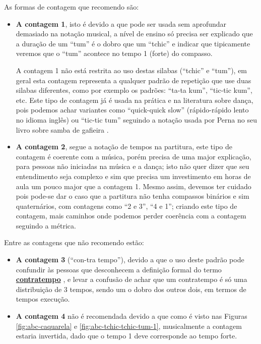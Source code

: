 As formas de contagem que recomendo são:
\begin{itemize}
\item \textbf{A contagem 1}, 
isto é devido a que pode ser usada sem aprofundar demasiado 
na notação musical, a nível de ensino só precisa ser explicado que a duração de um 
``tum'' é o dobro que um ``tchic'' e indicar que tipicamente veremos que o ``tum''
acontece no tempo 1 (forte) do compasso.

A contagem 1 não está restrita ao uso destas silabas (``tchic'' e ``tum''), 
em geral esta contagem representa a qualquer padrão de repetição
que use duas silabas diferentes, como por exemplo os padrões: ``ta-ta kum'', ``tic-tic kum'', etc. 
Este tipo de contagem já é usada na prática e na literatura sobre dança, pois 
podemos achar variantes como ``quick-quick slow'' (rápido-rápido lento no idioma inglês)
ou ``tic-tic tum'' seguindo a notação usada por Perna no seu livro sobre samba de gafieira \cite[pp. 146]{perna2002samba}.
\item \textbf{A contagem 2}, segue a notação de tempos na partitura, este tipo de
contagem é coerente com a música, porém precisa de uma major explicação, 
para pessoas não iniciadas na música e a dança; isto não quer dizer que seu
entendimento seja complexo e sim que precisa um investimento em horas de aula
um pouco major que a contagem 1.
Mesmo assim, devemos ter cuidado pois pode-se dar o caso que a partitura não tenha compassos binários 
e sim quaternários, com contagens como ``2 e 3'', ``4 e 1''; 
criando este tipo de contagem, mais caminhos onde podemos perder coerência com a contagem seguindo a métrica.
\end{itemize}


Entre as contagens que não recomendo estão:
\begin{itemize}
\item \textbf{A contagem 3} (``con-tra tempo''), 
devido a que o uso deste padrão pode confundir às pessoas que desconhecem 
a definição formal do termo \hyperref[sec:contratempo]{\textbf{contratempo}} 
\cite[pp. 16]{mascarenhascurso} \cite[pp. 36]{azevedocompor}, 
e levar a confusão de achar que um contratempo é só uma distribuição de 3 tempos, 
sendo um o dobro dos outros dois, em termos de tempos execução.
\item \textbf{A contagem 4} não é recomendada devido a que como é visto nas Figuras 
\ref{fig:abc-caquarela} e \ref{fig:abc-tchic-tchic-tum-1}, musicalmente a contagem estaria invertida,
dado que o tempo 1 deve corresponde ao tempo forte.
\end{itemize}~

